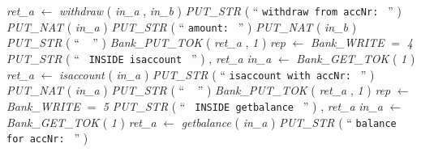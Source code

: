 \begin{tabbing}
{\em ret\_a\/} $\longleftarrow$ {\em withdraw\/}\label{withdraw}  ( {\em in\_a\/} , {\em in\_b\/} )  \bStatementSemiColon \bnl
{\em PUT\_STR\/}\label{PUT_STR}  (  `` {\tt withdraw from accNr: } ''  )  \bStatementSemiColon \bnl
{\em PUT\_NAT\/}\label{PUT_NAT}  ( {\em in\_a\/} )  \bStatementSemiColon \bnl
{\em PUT\_STR\/}\label{PUT_STR}  (  `` {\tt  amount: } ''  )  \bStatementSemiColon \bnl
{\em PUT\_NAT\/}\label{PUT_NAT}  ( {\em in\_b\/} )  \bStatementSemiColon \bnl
{\em PUT\_STR\/}\label{PUT_STR}  (  `` {\tt
} ''  )  \bStatementSemiColon \bnl
{\em Bank\_PUT\_TOK\/}\label{Bank_PUT_TOK}  ( {\em ret\_a\/} , {\em 1\/} )  \bStatementSemiColon \bnl
{\em rep\/} $\longleftarrow$ {\em Bank\_WRITE\/}\label{Bank_WRITE}  \-\bnl
{}  \-\bnl
{}  \bStatementSemiColon \bnl
{}  $=$ {\em 4\/} \- \bhsp {} \+\bnl
{\em PUT\_STR\/}\label{PUT_STR}  (  `` {\tt
INSIDE isaccount
} ''  )  \bStatementSemiColon \bnl
{}  , {\em ret\_a\/} \- \bhsp {} \+\bnl
{\em in\_a\/} $\longleftarrow$ {\em Bank\_GET\_TOK\/}\label{Bank_GET_TOK}  ( {\em 1\/} )  \bStatementSemiColon \bnl
{\em ret\_a\/} $\longleftarrow$ {\em isaccount\/}\label{isaccount}  ( {\em in\_a\/} )  \bStatementSemiColon \bnl
{\em PUT\_STR\/}\label{PUT_STR}  (  `` {\tt isaccount with accNr: } ''  )  \bStatementSemiColon \bnl
{\em PUT\_NAT\/}\label{PUT_NAT}  ( {\em in\_a\/} )  \bStatementSemiColon \bnl
{\em PUT\_STR\/}\label{PUT_STR}  (  `` {\tt
} ''  )  \bStatementSemiColon \bnl
{\em Bank\_PUT\_TOK\/}\label{Bank_PUT_TOK}  ( {\em ret\_a\/} , {\em 1\/} )  \bStatementSemiColon \bnl
{\em rep\/} $\longleftarrow$ {\em Bank\_WRITE\/}\label{Bank_WRITE}  \-\bnl
{}  \-\bnl
{}  \bStatementSemiColon \bnl
{}  $=$ {\em 5\/} \- \bhsp {} \+\bnl
{\em PUT\_STR\/}\label{PUT_STR}  (  `` {\tt
INSIDE getbalance
} ''  )  \bStatementSemiColon \bnl
{}  , {\em ret\_a\/} \- \bhsp {} \+\bnl
{\em in\_a\/} $\longleftarrow$ {\em Bank\_GET\_TOK\/}\label{Bank_GET_TOK}  ( {\em 1\/} )  \bStatementSemiColon \bnl
{\em ret\_a\/} $\longleftarrow$ {\em getbalance\/}\label{getbalance}  ( {\em in\_a\/} )  \bStatementSemiColon \bnl
{\em PUT\_STR\/}\label{PUT_STR}  (  `` {\tt balance for accNr: } ''  )  \bStatementSemiColon \bnl

\end{tabbing}
